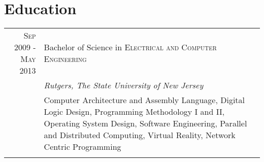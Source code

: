 \documentclass[a4paper, 10pt, onepage]{article} %
\begin{document}
\section{Education}
\begin{tabular}{r|p{10cm}}
\textsc{Sep 2009 - May 2013} & Bachelor of Science in \textsc{Electrical and Computer Engineering}\\
& \small\emph{Rutgers, The State University of New Jersey}\\
& \footnotesize{Computer Architecture and Assembly Language, Digital Logic Design, Programming Methodology I and II, Operating System Design, Software Engineering, Parallel and Distributed Computing, Virtual Reality, Network Centric Programming}\\
\multicolumn{2}{c}{}\\
\end{tabular}
\end{document}
